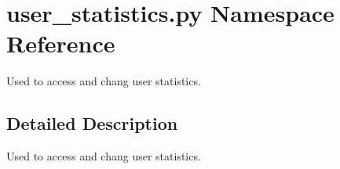 \hypertarget{namespaceuser__statistics_1_1py}{}\section{user\+\_\+statistics.\+py Namespace Reference}
\label{namespaceuser__statistics_1_1py}


Used to access and chang user statistics.  




\subsection{Detailed Description}
Used to access and chang user statistics. 
